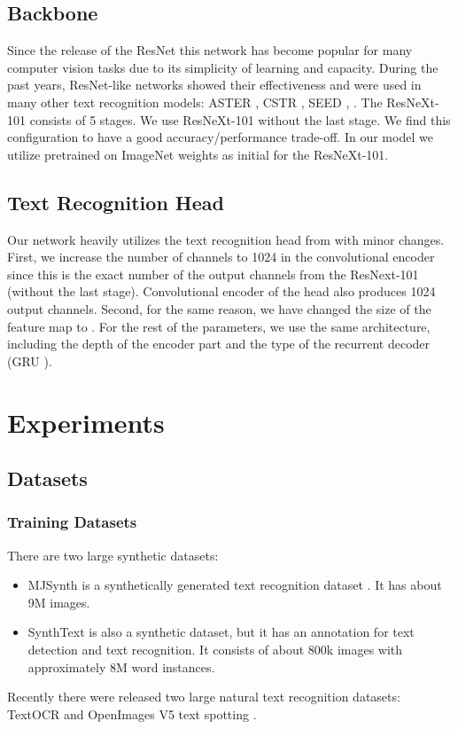 \documentclass[runningheads]{llncs}
\begin{document}
\subsection{Backbone}
Since the release of the ResNet \cite{resnet} this network has become popular for many
computer vision tasks due to its simplicity of learning and capacity.
During the past years, ResNet-like networks showed their effectiveness and were
used in many other text recognition models: ASTER \cite{aster}, CSTR \cite{cstr},
SEED \cite{qiao2020seed}, \cite{baek2019STRcomparisons}.
The ResNeXt-101 consists of 5 stages. We use ResNeXt-101
without the last stage. We find this configuration to have a good accuracy/performance trade-off.
In our model we utilize pretrained on ImageNet \cite{imagenet} weights as
initial for the ResNeXt-101.


\subsection{Text Recognition Head}
Our network heavily utilizes the text recognition head from \cite{krylov2021open} with minor
changes. First, we increase the number of channels to 1024 in the convolutional encoder since
this is the exact number of the output channels from the ResNext-101 (without the last stage).
Convolutional encoder of the head also produces 1024 output channels. Second, for the same
reason, we have changed the size of the feature map to . For the rest of the
parameters, we use the same architecture, including the depth of the encoder part and the type
of the recurrent decoder (GRU \cite{gru}).

\section{Experiments}
\label{sec:experiments}
\subsection{Datasets}

\subsubsection{Training Datasets}
There are two large synthetic datasets:
\begin{itemize}
  \item MJSynth is a synthetically generated text recognition dataset \cite{Jaderberg14c}.
        It has about 9M images.
  \item SynthText is also a synthetic dataset, but it has an annotation for text detection
        and text recognition. It consists of about 800k images with approximately 8M word instances.
\end{itemize}
Recently there were released two large natural text recognition datasets: TextOCR \cite{textocr}
and OpenImages V5 text spotting \cite{krylov2021open}.
\end{document}
